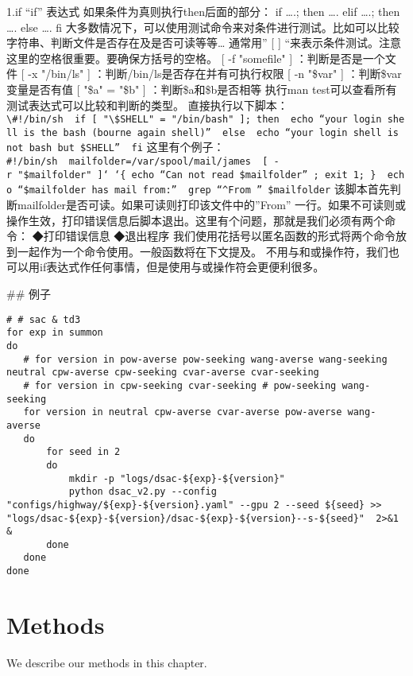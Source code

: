 \documentclass[]{book}
\begin{document}
1.if
``if'' 表达式 如果条件为真则执行then后面的部分：
if \ldots{}.; then
\ldots{}.
elif \ldots{}.; then
\ldots{}.
else
\ldots{}.
fi
大多数情况下，可以使用测试命令来对条件进行测试。比如可以比较字符串、判断文件是否存在及是否可读等等\ldots{}
通常用'' {[} {]} ``来表示条件测试。注意这里的空格很重要。要确保方括号的空格。
{[} -f "somefile" {]} ：判断是否是一个文件
{[} -x "/bin/ls" {]} ：判断/bin/ls是否存在并有可执行权限
{[} -n "\$var" {]} ：判断\$var变量是否有值
{[} "\$a" = "\$b" {]} ：判断\$a和\$b是否相等
执行man test可以查看所有测试表达式可以比较和判断的类型。
直接执行以下脚本：
\texttt{\textbackslash{}\#!/bin/sh\ \ if\ {[}\ "\textbackslash{}\$SHELL"\ =\ "/bin/bash"\ {]};\ then\ \ echo\ “your\ login\ shell\ is\ the\ bash\ (bourne\ again\ shell)”\ \ else\ \ echo\ “your\ login\ shell\ is\ not\ bash\ but\ \$SHELL”\ \ fi}
这里有个例子：
\texttt{\#!/bin/sh\ \ mailfolder=/var/spool/mail/james\ \ {[}\ -r\ "\$mailfolder"\ {]}‘\ ‘\{\ echo\ “Can\ not\ read\ \$mailfolder”\ ;\ exit\ 1;\ \}\ \ echo\ “\$mailfolder\ has\ mail\ from:”\ \ grep\ “\^{}From\ ”\ \$mailfolder}
该脚本首先判断mailfolder是否可读。如果可读则打印该文件中的''From'' 一行。如果不可读则或操作生效，打印错误信息后脚本退出。这里有个问题，那就是我们必须有两个命令：
◆打印错误信息
◆退出程序
我们使用花括号以匿名函数的形式将两个命令放到一起作为一个命令使用。一般函数将在下文提及。
不用与和或操作符，我们也可以用if表达式作任何事情，但是使用与或操作符会更便利很多。

\#\# 例子

\begin{verbatim}
# # sac & td3
for exp in summon 
do
   # for version in pow-averse pow-seeking wang-averse wang-seeking neutral cpw-averse cpw-seeking cvar-averse cvar-seeking
   # for version in cpw-seeking cvar-seeking # pow-seeking wang-seeking
   for version in neutral cpw-averse cvar-averse pow-averse wang-averse
   do
       for seed in 2
       do
           mkdir -p "logs/dsac-${exp}-${version}"
           python dsac_v2.py --config "configs/highway/${exp}-${version}.yaml" --gpu 2 --seed ${seed} >> "logs/dsac-${exp}-${version}/dsac-${exp}-${version}--s-${seed}"  2>&1 &
       done
   done
done
\end{verbatim}

\hypertarget{methods}{%
\chapter{Methods}\label{methods}}

We describe our methods in this chapter.
\end{document}
